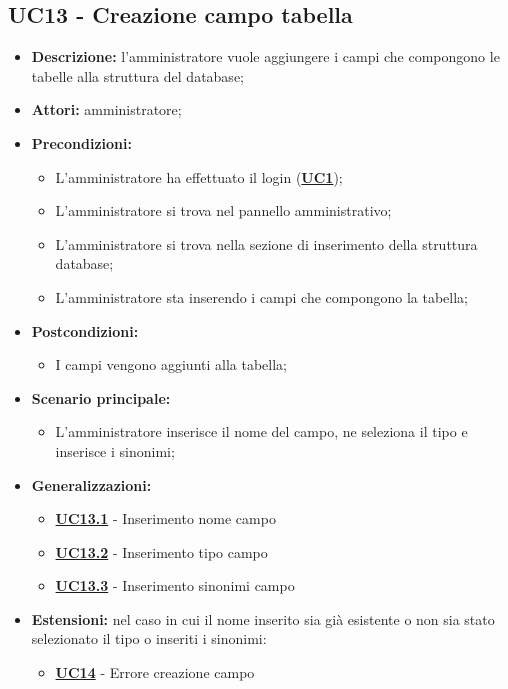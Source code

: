 \subsection{UC13 - Creazione campo tabella}
\label{sec:UC13}
\begin{itemize}
	\item \textbf{Descrizione:} l’amministratore vuole aggiungere i campi che compongono le tabelle alla struttura del database;
	\item \textbf{Attori:} amministratore;
	\item \textbf{Precondizioni:} 
	\begin{itemize}
		\item L’amministratore ha effettuato il login (\hyperref[sec:UC1]{\textbf{UC1}});
		\item L’amministratore si trova nel pannello amministrativo;
		\item L’amministratore si trova nella sezione di inserimento della struttura database;
		\item L’amministratore sta inserendo i campi che compongono la tabella;
	\end{itemize}
	\item \textbf{Postcondizioni:} 
	\begin{itemize}
		\item I campi vengono aggiunti alla tabella;
	\end{itemize}
	\item \textbf{Scenario principale:} 
	\begin{itemize}
		\item L’amministratore inserisce il nome del campo, ne seleziona il tipo e inserisce i sinonimi;
	\end{itemize}
	\item \textbf{Generalizzazioni:} 
	\begin{itemize}
		\item \hyperref[sec:UC13.1]{\textbf{UC13.1}} - Inserimento nome campo
		\item \hyperref[sec:UC13.2]{\textbf{UC13.2}} - Inserimento tipo campo
		\item \hyperref[sec:UC13.3]{\textbf{UC13.3}} - Inserimento sinonimi campo
	\end{itemize}
	\item \textbf{Estensioni:} nel caso in cui il nome inserito sia già esistente o non sia stato selezionato il tipo o inseriti i sinonimi:
	\begin{itemize}
		\item \hyperref[sec:UC14]{\textbf{UC14}} - Errore creazione campo
	\end{itemize}
\end{itemize}

